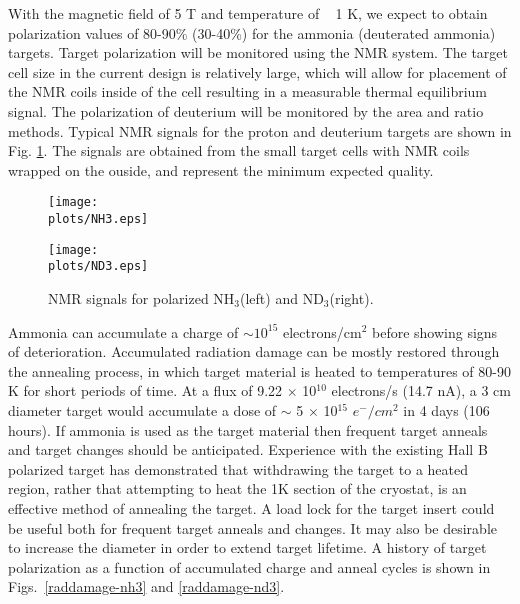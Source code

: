 With the magnetic field of 5 T and temperature of ~ 1 K, we expect to obtain polarization 
values of  80-90\% (30-40\%) for the ammonia (deuterated ammonia) targets.
Target polarization will be monitored using the NMR system.
The target cell size in the current design is relatively large, 
which will allow for placement of the NMR coils inside of the cell resulting in a 
measurable thermal equilibrium signal. The polarization of deuterium will be 
monitored  by the area and ratio methods.
Typical NMR signals 
for the proton and deuterium targets are shown in Fig. \ref{nmr}.
The signals are obtained from the small target cells 
with NMR coils wrapped on the ouside, and represent the minimum expected quality.

\begin{figure}
\centering
\begin{minipage}[t]{0.5\linewidth}
\centering
\texttt{[image: \\plots/NH3.eps]} 
\end{minipage}%
\begin{minipage}[t]{0.5\linewidth}
\centering
\texttt{[image: \\plots/ND3.eps]} 
\end{minipage}
\caption{\small{NMR signals for polarized NH$_3$(left) and ND$_3$(right).}}
\label{nmr}
\end{figure}

Ammonia can accumulate a charge of $\sim 10^{15}$ 
electrons/cm$^2$ before showing signs of deterioration.
 Accumulated radiation damage can be mostly restored through 
the annealing process, in which target material is heated to temperatures of 80-90 K for short periods of time.
At a flux of 9.22 $\times$ 10$^{10}$ electrons/s (14.7 nA), 
a 3 cm diameter target would accumulate a dose of  
$\sim$ 5 $\times$ 10$^{15}$ $e^-/cm^2$ in 4 days (106 hours). 
If ammonia is used as the target material then frequent target anneals and target changes 
should be anticipated. 
Experience with the existing Hall B polarized target has demonstrated that 
withdrawing the target to a heated region, 
rather that attempting to heat the 1K section of the cryostat, is an effective method of annealing the target.  A load lock for the target insert could be useful both for frequent target anneals and changes.
It may also be desirable to increase the diameter in order to extend target lifetime.
A history of target polarization as a function of accumulated charge and anneal cycles 
is shown in Figs.~\ref{raddamage-nh3} and \ref{raddamage-nd3}.

